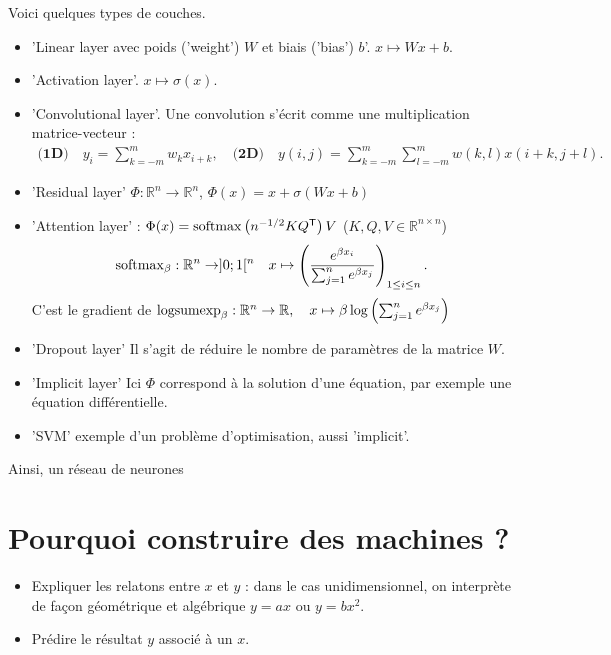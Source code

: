 \documentclass[11pt,a4paper, french]{article}
\newcommand{\R}{\mathbb R}
\newcommand{\transpose}[1]{{#1}^{\mathsf{T}}}
\begin{document}
%
Voici quelques types de couches.
%
\begin{itemize}
\item 'Linear layer avec poids ('weight') $W$ et biais ('bias') $b$'. $x \mapsto W x + b$.
\item 'Activation layer'. $x \mapsto \sigma(x)$.
\item 'Convolutional layer'. Une convolution s'écrit comme une multiplication matrice-vecteur :
\begin{align*}
\textbf{(1D)}\quad y_i = \sum_{k=-m}^m w_k x_{i+k},\quad \textbf{(2D)}\quad y(i,j) = \sum_{k=-m}^m\sum_{l=-m}^m w(k,l) x(i+k, j+l).
\end{align*}

\item 'Residual layer' $\Phi:\R^n\to\R^n$, $\Phi(x) = x +\sigma(W x + b)$
\item 'Attention layer' : $\Phi(x) = {\rm softmax}\left(n^{-1/2} K \transpose{Q}\right)V$ ($K,Q,V\in\R^{n\times n}$)
\begin{align*}
{\rm softmax}_{\beta}: \R^n\to]0;1[^n\quad x\mapsto \left(\frac{e^{\beta x_i}}{\sum_{j=1}^n e^{\beta x_j}}\right)_{1\le i\le n}.
\end{align*}
C'est le gradient de  ${\rm logsumexp}_{\beta}: \R^n\to\R,\quad x\mapsto \beta\log\left(\sum_{j=1}^n e^{\beta x_j}\right)$
\item 'Dropout layer' Il s'agit de réduire le nombre de paramètres de la matrice $W$.
\item 'Implicit layer' Ici $\Phi$ correspond à la solution d'une équation, par exemple une équation différentielle.
\item 'SVM' exemple d'un problème d'optimisation, aussi 'implicit'.
\end{itemize}
%
Ainsi, un \og réseau de neurones\fg
\section{Pourquoi construire des machines ?}\label{sec:}
%
\begin{itemize}
\item Expliquer les relatons entre $x$ et $y$ : dans le cas unidimensionnel, on interprète de façon géométrique et algébrique $y=a x$ ou $y=bx^2$.
\item Prédire le résultat $y$ associé à un $x$.
\end{itemize}
%
\end{document}
